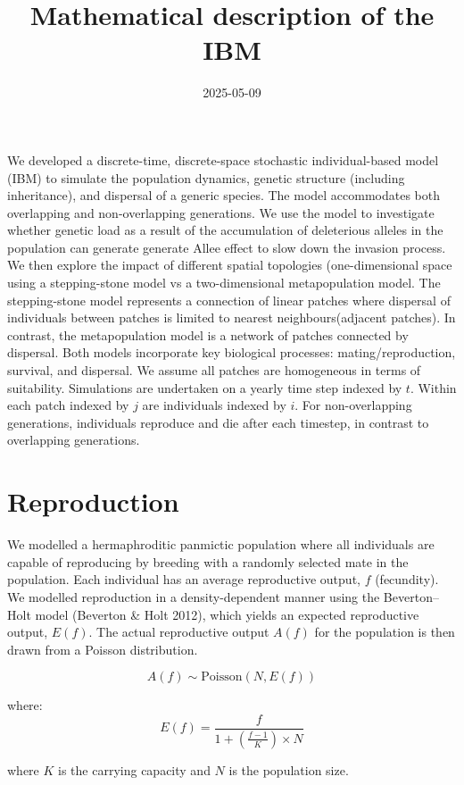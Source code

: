\documentclass[
]{article}
\title{Mathematical description of the IBM}
\author{}
\date{\vspace{-2.5em}2025-05-09}
\begin{document}
\maketitle

We developed a discrete-time, discrete-space stochastic individual-based
model (IBM) to simulate the population dynamics, genetic structure
(including inheritance), and dispersal of a generic species. The model
accommodates both overlapping and non-overlapping generations. We use
the model to investigate whether genetic load as a result of the
accumulation of deleterious alleles in the population can generate
generate Allee effect to slow down the invasion process. We then explore
the impact of different spatial topologies (one-dimensional space using
a stepping-stone model vs a two-dimensional metapopulation model. The
stepping-stone model represents a connection of linear patches where
dispersal of individuals between patches is limited to nearest
neighbours(adjacent patches). In contrast, the metapopulation model is a
network of patches connected by dispersal. Both models incorporate key
biological processes: mating/reproduction, survival, and dispersal. We
assume all patches are homogeneous in terms of suitability. Simulations
are undertaken on a yearly time step indexed by \(t\). Within each patch
indexed by \(j\) are individuals indexed by \(i\). For non-overlapping
generations, individuals reproduce and die after each timestep, in
contrast to overlapping generations.

\section{Reproduction}\label{reproduction}

We modelled a hermaphroditic panmictic population where all individuals
are capable of reproducing by breeding with a randomly selected mate in
the population. Each individual has an average reproductive output,
\(f\) (fecundity). We modelled reproduction in a density-dependent
manner using the Beverton--Holt model (Beverton \& Holt 2012), which
yields an expected reproductive output, \(E(f)\). The actual
reproductive output \(A(f)\) for the population is then drawn from a
Poisson distribution.

\[
A(f)\sim \text{Poisson}(N,E(f))
\]

where: \[
E(f) = \frac{f}{1 + (\frac{f - 1}{K}) \times N}
\]

where \(K\) is the carrying capacity and \(N\) is the population size.
\end{document}
